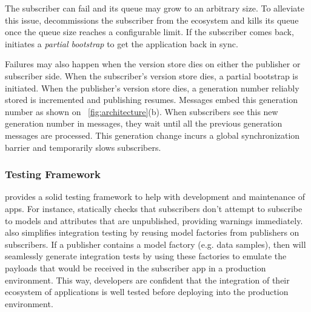The subscriber can fail and its queue may grow to an arbitrary size. To
alleviate this issue, \synapse decommissions the subscriber from the
\synapse ecosystem and kills its queue once the queue size reaches a
configurable limit. If the subscriber comes back, \synapse initiates a
{\em partial bootstrap} to get the application back in sync.

Failures may also happen when the version store dies on either the publisher or subscriber
side. When the subscriber's version store dies, a partial bootstrap is initiated. When
the publisher's version store dies, a generation number reliably stored is incremented
and publishing resumes. Messages embed this generation number as shown on
\F~\ref{fig:architecture}(b). When subscribers see this new generation number
 in messages, they wait until all the previous generation messages are
processed. This generation change incurs a global synchronization barrier and
temporarily slows subscribers.

\subsubsection{Testing Framework}
\label{sec:testing}

\synapse provides a solid testing framework to help with development and
maintenance of apps.  For instance, \synapse statically checks that subscribers
don't attempt to subscribe to models and attributes that are unpublished,
providing warnings immediately. \synapse also simplifies integration testing by
reusing model factories from publishers on subscribers.  If a publisher
contains a model factory (e.g. data samples), then \synapse will seamlessly
generate integration tests by using these factories to emulate the payloads that
would be received in the subscriber app in a production environment.  This way,
developers are confident that the integration of their ecosystem of applications
is well tested before deploying into the production environment.

